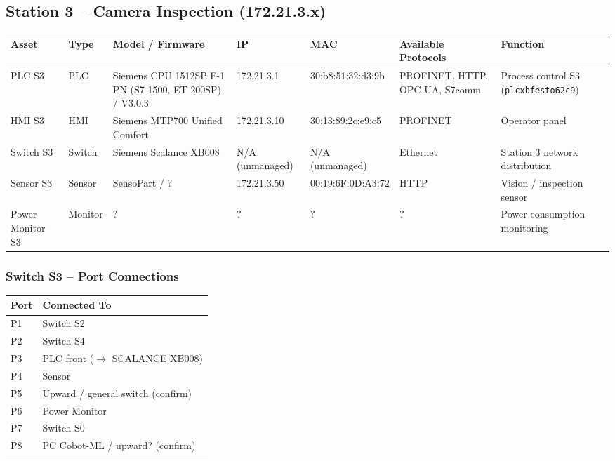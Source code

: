 \subsection{Station 3 – Camera Inspection (172.21.3.x)}

\begin{adjustbox}{max width=\textwidth}
\begin{tabular}{lllllll}
\toprule
\textbf{Asset} & \textbf{Type} & \textbf{Model / Firmware} & \textbf{IP} & \textbf{MAC} & \textbf{Available Protocols} & \textbf{Function} \\
\midrule
PLC S3       & PLC     & Siemens CPU 1512SP F-1 PN (S7-1500, ET 200SP) / V3.0.3 & 172.21.3.1  & 30:b8:51:32:d3:9b & PROFINET, HTTP, OPC-UA, S7comm & Process control S3 (\texttt{plcxbfesto62c9}) \\
HMI S3       & HMI     & Siemens MTP700 Unified Comfort & 172.21.3.10 & 30:13:89:2c:e9:c5 & PROFINET & Operator panel \\
Switch S3    & Switch  & Siemens Scalance XB008         & N/A (unmanaged) & N/A (unmanaged) & Ethernet & Station 3 network distribution \\
Sensor S3    & Sensor  & SensoPart / ?                  & 172.21.3.50 & 00:19:6F:0D:A3:72 & HTTP & Vision / inspection sensor \\
Power Monitor S3 & Monitor & ? & ? & ? & ? & Power consumption monitoring \\
\bottomrule
\end{tabular}
\end{adjustbox}

\subsubsection{Switch S3 – Port Connections}

\begin{tabular}{ll}
\toprule
\textbf{Port} & \textbf{Connected To} \\
\midrule
P1 & Switch S2 \\
P2 & Switch S4 \\
P3 & PLC front ($\rightarrow$ SCALANCE XB008) \\
P4 & Sensor \\
P5 & Upward / general switch (confirm) \\
P6 & Power Monitor \\
P7 & Switch S0 \\
P8 & PC Cobot-ML / upward? (confirm) \\
\bottomrule
\end{tabular}

